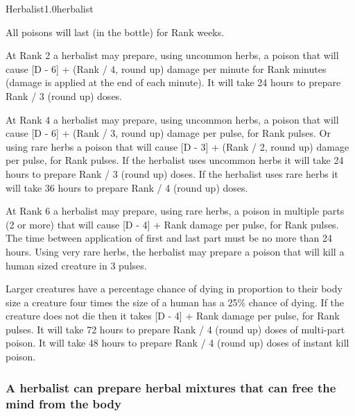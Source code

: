 \begin{skill}{Herbalist}{1.0}{herbalist}

All poisons will last (in the bottle) for Rank weeks.

\begin{Enumerate}

\item At Rank 2 a herbalist may prepare, using uncommon herbs, a poison
that will cause [D - 6] + (Rank / 4, round up) damage per minute for
Rank  minutes (damage is applied at the end of each minute).  It
will take 24 hours to prepare Rank / 3 (round up) doses.

\item At Rank 4 a herbalist may prepare, using uncommon herbs, a poison
that will cause [D - 6] + (Rank / 3, round up) damage per pulse, for Rank
 pulses. Or using rare herbs a poison that will cause [D - 3] +
(Rank / 2, round up) damage per pulse, for Rank  pulses. If the
herbalist uses uncommon herbs it will take 24 hours to prepare Rank / 3
(round up) doses.  If the herbalist uses rare herbs it will take 36
hours to prepare Rank / 4 (round up) doses.

\item At Rank 6 a herbalist may prepare, using rare herbs, a poison in
multiple parts (2 or more) that will cause [D - 4] + Rank damage per
pulse, for Rank pulses. The time between application of first and
last part must be no more than 24 hours.  Using very rare herbs, the
herbalist may prepare a poison that will kill a human sized creature
in 3 pulses.

Larger creatures have a percentage chance of dying in proportion to
their body size \eg a creature four times the size of a human has a
25\% chance of dying. If the creature does not die then it takes [D - 4]
+ Rank damage per pulse, for Rank pulses. It will take 72 hours to
prepare Rank / 4 (round up) doses of multi-part poison.  It will take 48
hours to prepare Rank / 4 (round up) doses of instant kill poison.

\end{Enumerate}


\subsubsection{A herbalist can prepare herbal mixtures that can free
the mind from the body}


\end{skill}
